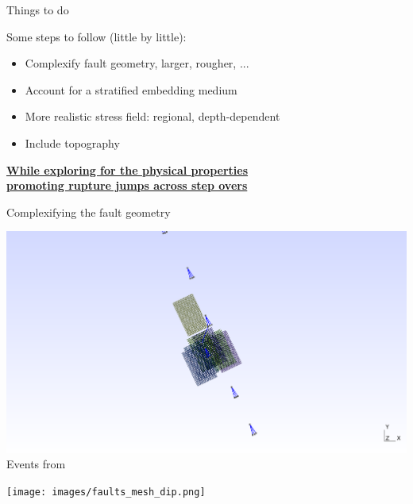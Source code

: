 \documentclass{beamer}
\begin{document}
\begin{frame}
 {Things to do}
 
 Some steps to follow (little by little): \\
 \vskip 0.4cm \pause
 \begin{itemize}
  \item Complexify fault geometry, larger, rougher, ... \pause
  \vskip 0.4cm
  \item Account for a stratified embedding medium \pause
  \vskip 0.4cm
  \item More realistic stress field: regional, depth-dependent \pause
  \vskip 0.4cm
  \item Include topography
 \end{itemize}
\pause
\begin{center}
 \underline{\bf While exploring for the physical properties}\\
 \underline{\bf promoting rupture jumps across step overs} 
\end{center}
 
\end{frame}

\begin{frame}
 {Complexifying the fault geometry}
 
 \begin{minipage}{0.45\linewidth}
  \includegraphics[width=1\linewidth]{images/faults.png}
  {\tiny Events from \cite{Tan_2021_MLB}}
 \end{minipage} \qquad \pause
 \begin{minipage}{0.45\linewidth}
  \texttt{[image: images/faults\_mesh\_dip.png]}
 \end{minipage}

\end{frame}
\end{document}
